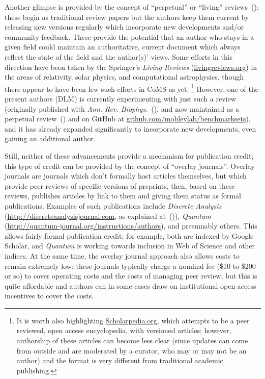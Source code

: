 \documentclass[9pt]{livecoms}
\begin{document}
Another glimpse is provided by the concept of ``perpetual'' or ``living'' reviews~(\cite{Mobley:2015:arXiv:1502.01329[cs]}); these begin as traditional review papers but the authors keep them current by releasing new versions regularly which incorporate new developments and/or community feedback.
These provide the potential that an author who stays in a given field could maintain an authoritative, current document which always reflect the state of the field and the author(s)' views. 
Some efforts in this direction have been taken by the Springer's \emph{Living Reviews} (\url{livingreviews.org}) in the areas of relativity, solar physics, and computational astrophysics, though there appear to have been few such efforts in CoMS as yet. 
\footnote{It is worth also highlighting \url{Scholarpedia.org}, which attempts to be a peer reviewed, open access encyclopedia, with versioned articles; however, authorship of these articles can become less clear (since updates can come from outside and are moderated by a curator, who may or may not be an author) and the format is very different from traditional academic publishing.}
However, one of the present authors (DLM) is currently experimenting with just such a review (originally published with \emph{Ann. Rev. Biophys.}~(\cite{Mobley:2017:AnnualReviewofBiophysics}), and now maintained as a perpetual review~(\cite{Mobley:2017:eScholarshipa}) and on GitHub at \url{github.com/mobleylab/benchmarksets}), and it has already expanded significantly to incorporate new developments, even gaining an additional author.

Still, neither of these advancements provide a mechanism for publication credit; this type of credit can be provided by the concept of ``overlay journals''.
Overlay journals are journals which don't formally host articles themselves, but which provide peer reviews of specific versions of preprints, then, based on these reviews, publishes articles by link to them and giving them status as formal publications.
Examples of such publications include \emph{Discrete Analysis} (\url{http://discreteanalysisjournal.com}, as explained at~(\cite{:2015:Gowers'sWeblog})), \emph{Quantum} (\url{http://quantum-journal.org/instructions/authors}), and presumably others. 
This allows fairly formal publication credit; for example, both are indexed by Google Scholar, and \emph{Quantum} is working towards inclusion in Web of Science and other indices. 
At the same time, the overlay journal approach also allows costs to remain extremely low; these journals typically charge a nominal fee (\$10 to \$200 or so) to cover operating costs and the costs of managing peer review, but this is quite affordable and authors can in some cases draw on institutional open access incentives to cover the costs. 
\end{document}

